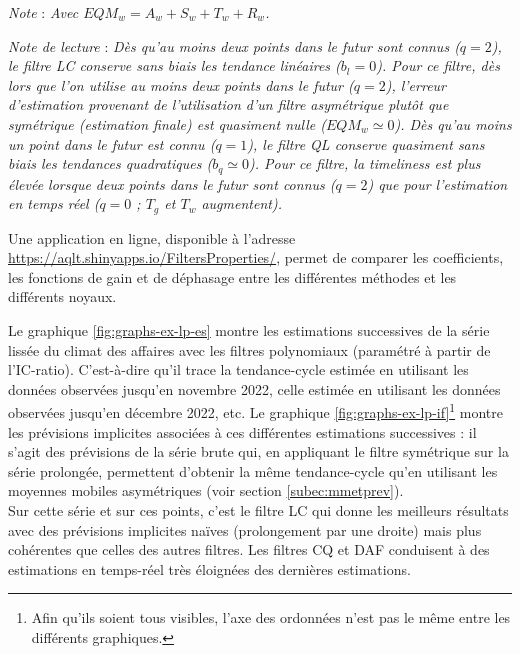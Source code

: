 \documentclass[
  12pt,
  a4paper,french]{article}
\newcommand\1{\mathds{1}}
\begin{document}
\begin{table}[!h]
\emph{Note} : \emph{Avec \(EQM_w=A_w + S_w + T_w + R_w\).}


\emph{Note de lecture} : \emph{Dès qu'au moins deux points dans le futur sont connus (\(q=2\)), le filtre LC conserve sans biais les tendance linéaires (\(b_l = 0\)). Pour ce filtre, dès lors que l'on utilise au moins deux points dans le futur (\(q=2\)), l'erreur d'estimation provenant de l'utilisation d'un filtre asymétrique plutôt que symétrique (estimation finale) est quasiment nulle (\(EQM_w\simeq 0\)). Dès qu'au moins un point dans le futur est connu (\(q=1\)), le filtre QL conserve quasiment sans biais les tendances quadratiques (\(b_q\simeq 0\)). Pour ce filtre, la \emph{timeliness} est plus élevée lorsque deux points dans le futur sont connus (\(q=2\)) que pour l'estimation en temps réel (\(q=0\) ; \(T_g\) et \(T_w\) augmentent).}
\normalsize\end{table}

Une application en ligne, disponible à l'adresse \url{https://aqlt.shinyapps.io/FiltersProperties/}, permet de comparer les coefficients, les fonctions de gain et de déphasage entre les différentes méthodes et les différents noyaux.

Le graphique \ref{fig:graphs-ex-lp-es} montre les estimations successives de la série lissée du climat des affaires avec les filtres polynomiaux (paramétré à partir de l'IC-ratio).
C'est-à-dire qu'il trace la tendance-cycle estimée en utilisant les données observées jusqu'en novembre 2022, celle estimée en utilisant les données observées jusqu'en décembre 2022, etc.
Le graphique \ref{fig:graphs-ex-lp-if}\footnote{
  Afin qu'ils soient tous visibles, l'axe des ordonnées n'est pas le même entre les différents graphiques.} montre les prévisions implicites associées à ces différentes estimations successives : il s'agit des prévisions de la série brute qui, en appliquant le filtre symétrique sur la série prolongée, permettent d'obtenir la même tendance-cycle qu'en utilisant les moyennes mobiles asymétriques (voir section \ref{subec:mmetprev}).\\
Sur cette série et sur ces points, c'est le filtre LC qui donne les meilleurs résultats avec des prévisions implicites naïves (prolongement par une droite) mais plus cohérentes que celles des autres filtres.
Les filtres CQ et DAF conduisent à des estimations en temps-réel très éloignées des dernières estimations.
\end{document}
